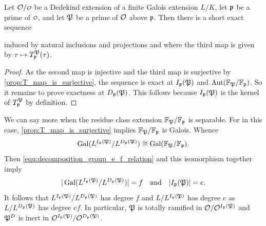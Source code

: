     \begin{proposition}\label{prop:inertia_group_exact_sequence}
      Let \(\mc{O}/\smc{O}\) be a Dedekind extension of a finite Galois extension \(L/K\), let \(\mathfrak{p}\) be a prime of \(\smc{O}\), and let \(\mathfrak{P}\) be a prime of \(\mathcal{O}\) above \(\mathfrak{p}\). Then there is a short exact sequence
      \begin{center}
      \end{center}
      induced by natural inclusions and projections and where the third map is given by \(\tau \mapsto T_{\mathfrak{p}}^{\mathfrak{P}}(\tau)\).
    \end{proposition}
    \begin{proof}
      As the second map is injective and the third map is surjective by \cref{prop:T_map_is_surjective}, the sequence is exact at \(I_{\mathfrak{p}}(\mathfrak{P})\) and \(\operatorname{\mathrm{Aut}}(\mathbb{F}_{\mathfrak{P}}/\mathbb{F}_{\mathfrak{p}})\). So it remains to prove exactness at \(D_{\mathfrak{p}}(\mathfrak{P})\). This follows because \(I_{\mathfrak{p}}(\mathfrak{P})\) is the kernel of \(T_{\mathfrak{p}}^{\mathfrak{P}}\) by definition.
    \end{proof}

    We can say more when the residue class extension \(\mathbb{F}_{\mathfrak{P}}/\mathbb{F}_{\mathfrak{p}}\) is separable. For in this case, \cref{prop:T_map_is_surjective} implies \(\mathbb{F}_{\mathfrak{P}}/\mathbb{F}_{\mathfrak{p}}\) is Galois. Whence
    \[
      \operatorname{\mathrm{Gal}}(L^{I_{\mathfrak{p}}(\mathfrak{P})}/L^{D_{\mathfrak{p}}(\mathfrak{P})}) \cong \operatorname{\mathrm{Gal}}(\mathbb{F}_{\mathfrak{P}}/\mathbb{F}_{\mathfrak{p}}).
    \]
    Then \cref{equ:decomposition_group_e_f_relation} and this isomorphism together imply 
    \[
      |\operatorname{\mathrm{Gal}}(L^{I_{\mathfrak{p}}(\mathfrak{P})}/L^{D_{\mathfrak{p}}(\mathfrak{P})})| = f \quad \text{and} \quad |I_{\mathfrak{p}}(\mathfrak{P})| = e.
    \]
    It follows that \(L^{I_{\mathfrak{p}}(\mathfrak{P})}/L^{D_{\mathfrak{p}}(\mathfrak{P})}\) has degree \(f\) and \(L/L^{I_{\mathfrak{p}}(\mathfrak{P})}\) has degree \(e\) as \(L/L^{D_{\mathfrak{p}}(\mathfrak{P})}\) has degree \(ef\). In particular, \(\mathfrak{P}\) is totally ramified in \(\mathcal{O}/\mathcal{O}^{I_{\mathfrak{p}}(\mathfrak{P})}\) and \(\mathfrak{P}^{D}\) is inert in \(\mathcal{O}^{I_{\mathfrak{p}}(\mathfrak{P})}/\mathcal{O}^{D_{\mathfrak{p}}(\mathfrak{P})}\).

